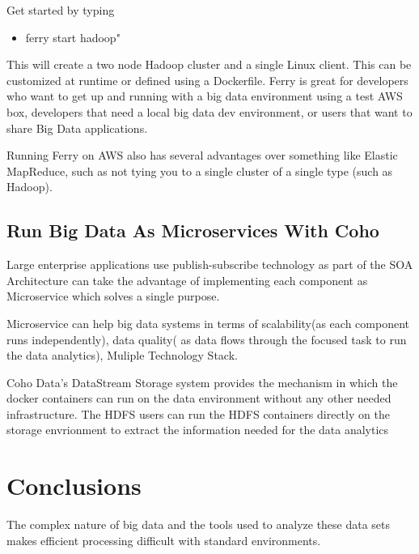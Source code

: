 \documentclass[sigconf]{acmart}
\begin{document}
	Get started by typing
	
	\begin{itemize}
		\item[] ferry start hadoop"
	\end{itemize}	
	
	
	This will create a two node Hadoop cluster and a single Linux client. This can be customized at runtime or defined using a Dockerfile.
	Ferry is great for developers who want to get up and running with a big data environment using a test AWS box, developers that need a local big data dev environment, or users that want to share Big Data applications.
	
	Running Ferry on AWS also has several advantages over something like Elastic MapReduce, such as not tying you to a single cluster of a single type (such as Hadoop).\cite{Ferry}
	
	\subsection{Run Big Data As Microservices With Coho}
	
	Large enterprise applications use publish-subscribe technology as part of the SOA Architecture can take the advantage of implementing each component as Microservice which solves a single purpose.
	
	Microservice can help big data systems in terms of scalability(as each component runs independently), data quality( as data flows through the focused task to run the data analytics), Muliple Technology Stack.
	
	Coho Data's DataStream Storage system provides the mechanism in which the docker containers can run on the data environment without any other needed infrastructure.
	The HDFS users can run the HDFS containers directly on the storage envrionment to extract the information needed for the data analytics\cite{Coho}
	
	\section{Conclusions}
	
	The complex nature of big data and the tools used to analyze these data sets makes efficient processing difficult with standard environments. 
	
\end{document}
